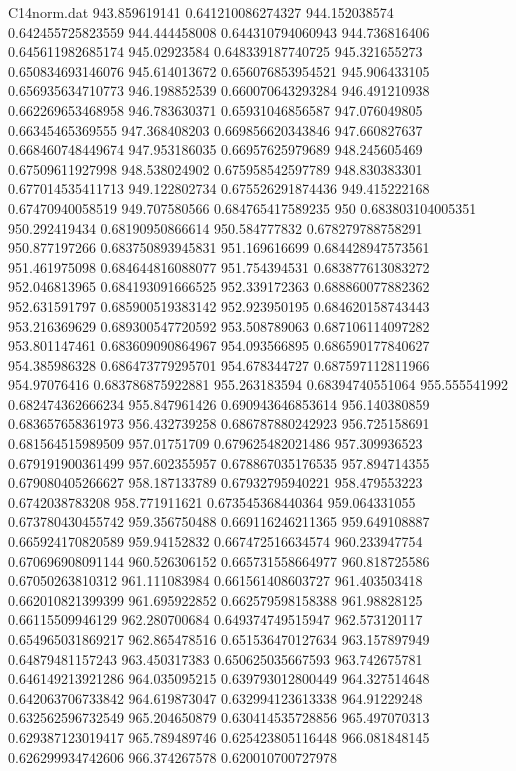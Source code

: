 \begin{filecontents}{C14norm.dat}
943.859619141			0.641210086274327
944.152038574			0.642455725823559
944.444458008			0.644310794060943
944.736816406			0.645611982685174
945.02923584			0.648339187740725
945.321655273			0.650834693146076
945.614013672			0.656076853954521
945.906433105			0.656935634710773
946.198852539			0.660070643293284
946.491210938			0.662269653468958
946.783630371			0.65931046856587
947.076049805			0.66345465369555
947.368408203			0.669856620343846
947.660827637			0.668460748449674
947.953186035			0.66957625979689
948.245605469			0.67509611927998
948.538024902			0.675958542597789
948.830383301			0.677014535411713
949.122802734			0.675526291874436
949.415222168			0.67470940058519
949.707580566			0.684765417589235
950			0.683803104005351
950.292419434			0.68190950866614
950.584777832			0.678279788758291
950.877197266			0.683750893945831
951.169616699			0.684428947573561
951.461975098			0.684644816088077
951.754394531			0.683877613083272
952.046813965			0.684193091666525
952.339172363			0.688860077882362
952.631591797			0.685900519383142
952.923950195			0.684620158743443
953.216369629			0.689300547720592
953.508789063			0.687106114097282
953.801147461			0.683609090864967
954.093566895			0.686590177840627
954.385986328			0.686473779295701
954.678344727			0.687597112811966
954.97076416			0.683786875922881
955.263183594			0.68394740551064
955.555541992			0.682474362666234
955.847961426			0.690943646853614
956.140380859			0.683657658361973
956.432739258			0.686787880242923
956.725158691			0.681564515989509
957.01751709			0.679625482021486
957.309936523			0.679191900361499
957.602355957			0.678867035176535
957.894714355			0.679080405266627
958.187133789			0.67932795940221
958.479553223			0.6742038783208
958.771911621			0.673545368440364
959.064331055			0.673780430455742
959.356750488			0.669116246211365
959.649108887			0.665924170820589
959.94152832			0.667472516634574
960.233947754			0.670696908091144
960.526306152			0.665731558664977
960.818725586			0.67050263810312
961.111083984			0.661561408603727
961.403503418			0.662010821399399
961.695922852			0.662579598158388
961.98828125			0.66115509946129
962.280700684			0.649374749515947
962.573120117			0.654965031869217
962.865478516			0.651536470127634
963.157897949			0.64879481157243
963.450317383			0.650625035667593
963.742675781			0.646149213921286
964.035095215			0.639793012800449
964.327514648			0.642063706733842
964.619873047			0.632994123613338
964.91229248			0.632562596732549
965.204650879			0.630414535728856
965.497070313			0.629387123019417
965.789489746			0.625423805116448
966.081848145			0.626299934742606
966.374267578			0.620010700727978

\end{filecontents}
